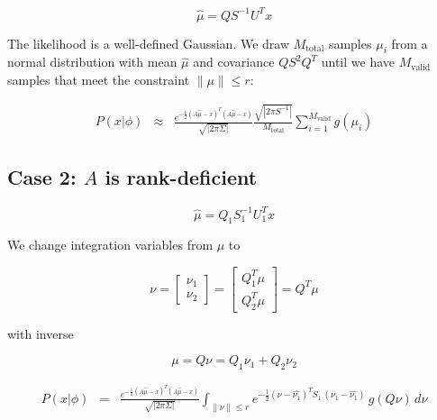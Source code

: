 \documentclass{amsart}
\begin{document}
\begin{equation}
  \hat{\mu} = Q S^{-1} U^T x
\end{equation}

The likelihood is a well-defined Gaussian.  We draw $M_{\mathrm{total}}$
samples $\mu_i$ from a normal distribution with mean $\hat{\mu}$ and
covariance $Q S^{2} Q^T$ until we have $M_{\mathrm{valid}}$ samples that meet
the constraint $\lVert \mu \rVert \le r$:

\begin{eqnarray}
  P(x|\phi) &\approx& 
  \frac{e^{-\frac{1}{2}(A\hat{\mu}-x)^T(A\hat{\mu}-x)}}
       {\sqrt{\left|2\pi\Sigma\right|}}
  \frac{\sqrt{\left|2\pi S^{-1}\right|}}{M_{\mathrm{total}}}
  \sum_{i=1}^{M_{\mathrm{valid}}} g(\mu_i)
\end{eqnarray}

\subsection{Case 2: $A$ is rank-deficient}

\begin{equation}
  \hat{\mu} = Q_1 S_1^{-1} U_1^T x
\end{equation}

We change integration variables from $\mu$ to 

\begin{equation}
  \nu = 
  \left[\begin{array}{ c }
      \nu_1 \\
      \nu_2
    \end{array}\right]
  =
  \left[\begin{array}{ c }
      Q_1^T\mu \\
      Q_2^T\mu
    \end{array}\right]
  =
  Q^T \mu
\end{equation}

with inverse

\begin{equation}
  \mu = Q\nu = Q_1\nu_1 + Q_2\nu_2
\end{equation}

\begin{eqnarray}
  P(x|\phi) &=&
  \frac{e^{-\frac{1}{2}(A\hat{\mu}-x)^T(A\hat{\mu}-x)}}
       {\sqrt{\left|2\pi\Sigma\right|}}
  \int_{\lVert\nu\rVert \le r} \!\!\!\!\!\!\!\!\!\!\!\!
  e^{-\frac{1}{2}(\nu-\hat{\nu_1})^T\!S_1\,(\nu_1-\hat{\nu_1})}\,g(Q\nu)\,d\nu
\end{eqnarray}
\end{document}
